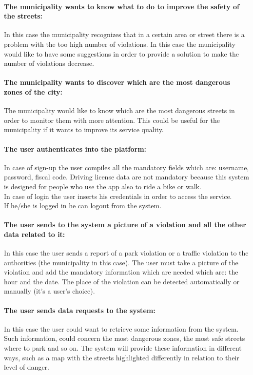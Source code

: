 \documentclass[titlepage]{article}
\begin{document}
\paragraph{The municipality wants to know what to do to 				improve the safety of the streets: }
In this case the municipality recognizes that in a certain area or street there is a problem with the too high number of violations. In this case the municipality would like to have some suggestions in order to provide a solution to make the number of violations decrease.
\paragraph{The municipality wants to discover which are the most dangerous zones of the city: }
The municipality would like to know which are the most dangerous streets in order to monitor them with more attention. This could be useful for the municipality if it wants to improve its service quality.
\paragraph{The user authenticates into the platform: }
In case of sign-up the user compiles all the mandatory fields which are: username, password, fiscal code. Driving license data are not mandatory because this system is designed for people who use the app also to ride a bike or walk. \\
In case of login the user inserts his credentials in order to access the service. \\
If he/she is logged in he can logout from the system.
\paragraph{The user sends to the system a picture of a            	violation and all the other data related to it: }
In this case the user sends a report of a park violation or a traffic violation to the authorities (the municipality in this case). The user must take a picture of the violation and add the mandatory information which are needed which are: the hour and the date. The place of the violation can be detected automatically or manually (it's a user's choice).
\paragraph{The user sends data requests to the system: }
In this case the user could want to retrieve some information from the system. Such information, could concern the most dangerous zones, the most safe streets where to park and so on. The system will provide these information in different ways, such as a map with the streets highlighted differently in relation to their level of danger.
\end{document}
